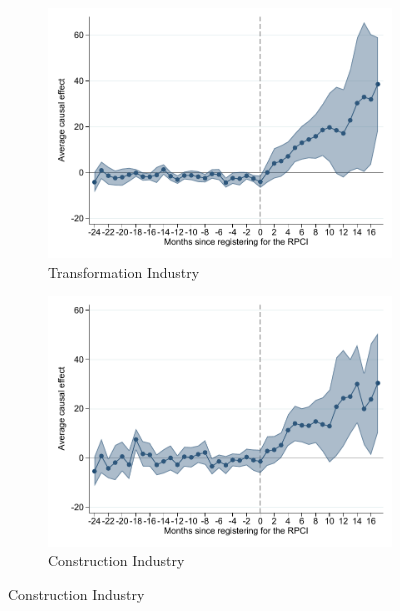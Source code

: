 \documentclass[oneside,11pt]{article}
\begin{document}
\clearpage

\begin{figure}[H]
    \caption{Event studies - RPCI effect on wage by firm characteristics}
    \label{event_study_firm_characteristics}
    \begin{center}
    
    \begin{subfigure}{0.49\textwidth}
    \caption{Transformation Industry}
    \includegraphics[width=\textwidth]{04_Figures/muestra_10porciento/event_study_sal_cierre_chaisemartin_div_final_3.pdf}
    \end{subfigure}
    \begin{subfigure}{0.49\textwidth}
    \caption{Construction Industry}
    \includegraphics[width=\textwidth]{04_Figures/muestra_10porciento/event_study_sal_cierre_chaisemartin_div_final_4.pdf}
    \end{subfigure}
    

\end{center}
\end{figure}
\end{document}
